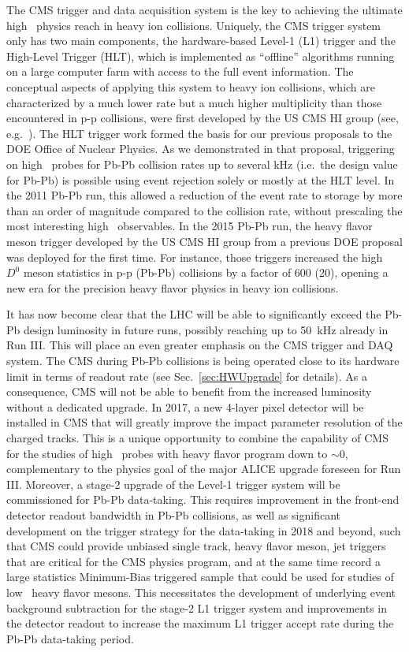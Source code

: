 The CMS trigger and data acquisition system is the key to achieving the ultimate high \pt\ physics reach in heavy ion collisions. Uniquely, the CMS trigger system only has two main components, the hardware-based Level-1 (L1) trigger and the High-Level Trigger (HLT), which is implemented as ``offline'' algorithms running on a large computer farm with access to the full event information.  
The conceptual aspects of applying this system to heavy ion collisions, which are characterized by a much lower rate but a much higher multiplicity than those encountered in p-p collisions, were first developed by the US CMS HI group (see, e.g.\ \cite{Roland:2007is}). The HLT trigger work formed the basis for our previous proposals to the DOE Office of Nuclear Physics. As we demonstrated in that proposal, triggering on high \pt\ probes for Pb-Pb collision rates up to several kHz (i.e.\ the design value for Pb-Pb) is possible using event rejection solely or mostly at the HLT level. In the 2011 Pb-Pb run, this allowed a reduction of the event rate to storage by more than an order of magnitude compared to the collision rate, without prescaling the most interesting high \pt\ observables. In the 2015 Pb-Pb run, the heavy flavor meson trigger developed by the US CMS HI group from a previous DOE proposal was deployed for the first time. For instance, those triggers increased the high \pt\ $D^0$ meson statistics in p-p (Pb-Pb) collisions by a factor of 600 (20), opening a new era for the precision heavy flavor physics in heavy ion collisions.

It has now become clear that the LHC will be able to significantly exceed the Pb-Pb design luminosity in future runs, possibly reaching up to 50~kHz already in Run III. This will place an even greater emphasis on the CMS trigger and DAQ system. The CMS during Pb-Pb collisions is being operated close to its hardware limit in terms of readout rate (see Sec.~\ref{sec:HWUpgrade} for details). As a consequence, CMS will not be able to benefit from the increased luminosity without a dedicated upgrade. 
In 2017, a new 4-layer pixel detector will be installed in CMS that will greatly improve the impact parameter resolution of the charged tracks. This is a unique opportunity to combine the capability of CMS for the studies of high \pt\ probes with heavy flavor program down to \pt$\sim 0$, complementary to the physics goal of the major ALICE upgrade foreseen for Run III. Moreover, a stage-2 upgrade of the Level-1 trigger system will be commissioned for Pb-Pb data-taking. This requires improvement in the front-end detector readout bandwidth in Pb-Pb collisions, as well as significant development on the trigger strategy for the data-taking in 2018 and beyond, such that CMS could provide unbiased single track, heavy flavor meson, jet triggers that are critical for the CMS physics program, and at the same time record a large statistics Minimum-Bias triggered sample that could be used for studies of low \pt\ heavy flavor mesons. This necessitates the development of underlying event background subtraction for the stage-2 L1 trigger system and improvements in the detector readout to increase the maximum L1 trigger accept rate during the Pb-Pb data-taking period.

